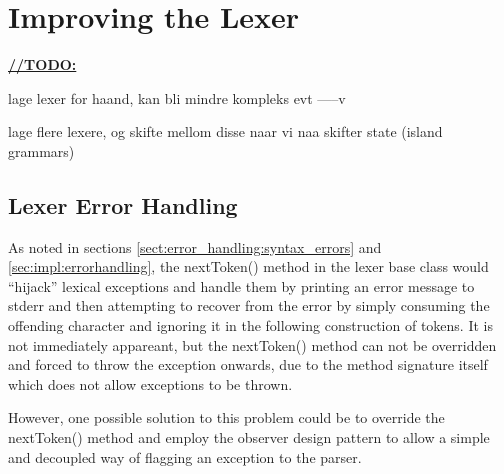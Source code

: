 \section{Improving the Lexer}


\underline{\textbf{\LARGE //TODO:}}

lage lexer for haand, kan bli mindre kompleks evt -----v

lage flere lexere, og skifte mellom disse naar vi naa skifter state (island grammars)

\subsection{Lexer Error Handling}
As noted in sections \ref{sect:error_handling:syntax_errors} and
\ref{sec:impl:errorhandling}, the nextToken() method in the lexer base class
would ``hijack'' lexical exceptions and handle them by printing an error message
to stderr and then attempting to recover from the error by simply consuming the
offending character and ignoring it in the following construction of tokens. It is 
not immediately appareant, but the nextToken() method can not be overridden and
forced to throw the exception onwards, due to the method signature itself which
does not allow exceptions to be thrown. 

However, one possible solution to this problem could be to override the
nextToken() method and employ the observer design
pattern to allow a
simple and decoupled way of flagging an exception to the parser.
